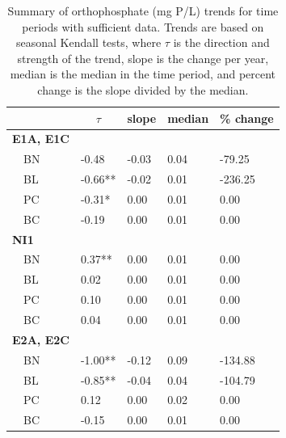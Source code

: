 \documentclass[letterpaper,12pt]{article}\usepackage[]{graphicx}\usepackage[]{color}
\begin{document}
\clearpage

\begin{table}[!tbp]
\caption{Summary of orthophosphate (mg P/L) trends for time periods with sufficient data.  Trends are based on seasonal Kendall tests, where $\tau$ is the direction and strength of the trend, slope is the change per year, median is the median in the time period, and percent change is the slope divided by the median.\label{tab:PO4Ftrnd}} 
\begin{center}
\begin{tabular}{lllll}
\hline\hline
\multicolumn{1}{l}{}&\multicolumn{1}{c}{$\tau$}&\multicolumn{1}{c}{slope}&\multicolumn{1}{c}{median}&\multicolumn{1}{c}{\% change}\tabularnewline
\hline
{\bfseries E1A, E1C}&&&&\tabularnewline
~~BN&-0.48&-0.03&0.04&-79.25\tabularnewline
~~BL&-0.66**&-0.02&0.01&-236.25\tabularnewline
~~PC&-0.31*&0.00&0.01&0.00\tabularnewline
~~BC&-0.19&0.00&0.01&0.00\tabularnewline
\hline
{\bfseries NI1}&&&&\tabularnewline
~~BN&0.37**&0.00&0.01&0.00\tabularnewline
~~BL&0.02&0.00&0.01&0.00\tabularnewline
~~PC&0.10&0.00&0.01&0.00\tabularnewline
~~BC&0.04&0.00&0.01&0.00\tabularnewline
\hline
{\bfseries E2A, E2C}&&&&\tabularnewline
~~BN&-1.00**&-0.12&0.09&-134.88\tabularnewline
~~BL&-0.85**&-0.04&0.04&-104.79\tabularnewline
~~PC&0.12&0.00&0.02&0.00\tabularnewline
~~BC&-0.15&0.00&0.01&0.00\tabularnewline
\hline
\end{tabular}\end{center}
\end{table}
\end{document}
